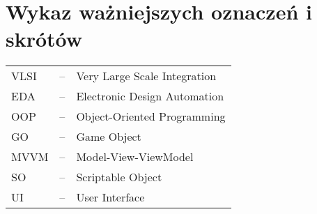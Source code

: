\section*{Wykaz ważniejszych oznaczeń i skrótów}
\label{sec:oznaczenia_i_skroty}
\begin{tabular}{l l l}
    \footnotesize VLSI & -- & \footnotesize Very Large Scale Integration \\
    \footnotesize EDA & -- & \footnotesize Electronic Design Automation \\
    \footnotesize OOP & -- & \footnotesize Object-Oriented Programming \\
    \footnotesize GO & -- & \footnotesize Game Object \\
    \footnotesize MVVM & -- & \footnotesize Model-View-ViewModel \\
    \footnotesize SO & -- & \footnotesize Scriptable Object \\
    \footnotesize UI & -- & \footnotesize User Interface \\
\end{tabular}
    